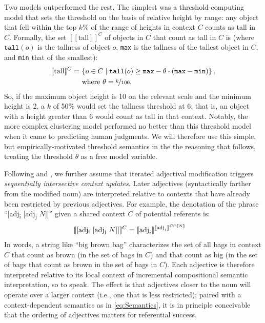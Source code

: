 \documentclass[10pt,a4paper]{article}
\newcommand{\den}[1]{\ensuremath{[\![#1]\!]}}
\begin{document}
Two models outperformed the rest. The simplest was a threshold-computing model that sets the threshold on the basis of relative height by range: any object that fell within the top $k\%$ of the range of heights in context $C$ counts as tall in $C$. Formally, the set $\den{\text{tall}}^C$ of objects in $C$ that count as tall in $C$ is (where $\texttt{tall}(o)$ is the tallness of object $o$, \texttt{max} is the tallness of the tallest object in $C$, and \texttt{min} that of the smallest):
\begin{align}
  \label{eq:Semantics}
  \den{\text{tall}}^C  = & \ \{ o \in C \mid \texttt{tall}(o) \ge \texttt{max} - \theta \cdot (\texttt{max} - \texttt{min}) \} \,, \\
  & \text{ where $\theta = \nicefrac{k}{100}$.} \nonumber
\end{align}
So, if the maximum object height is 10 on the relevant scale and the minimum height is 2, a $k$ of 50\% would set the tallness threshold at 6; that is, an object with a height greater than 6 would count as tall in that context. Notably, the more complex clustering model performed no better than this threshold model when it came to predicting human judgments. We will therefore use this simple, but empirically-motivated threshold semantics in the the reasoning that follows, treating the threshold $\theta$ as a free model variable.

Following  and , we further assume that iterated adjectival modification triggers \emph{sequentially intersective context updates}. Later adjectives (syntactically farther from the modified noun) are interpreted relative to contexts that have already been restricted by previous adjectives. For example, the denotation of the phrase ``[adj\textsubscript{i} [adj\textsubscript{j} $N$]]'' given a shared context $C$ of potential referents is:
\begin{align}
  \label{eq:SequentialInterpretation}
  \den{\text{[adj\textsubscript{i} [adj\textsubscript{j} $N$]]}}^{C} & = \den{\text{adj}_i}^{\den{\text{adj}_j}^{C\cap \den{N}}} 
\end{align} 
In words, a string like ``big brown bag'' characterizes the set of all bags in context $C$ that count as brown (in the set of bags in $C$) and that count as big (in the set of bags that count as brown in the set of bags in $C$). Each adjective is therefore interpreted relative to its local context of incremental compositional semantic interpretation, so to speak. The effect is that adjectives closer to the noun will operate over a larger context (i.e., one that is less restricted); paired with a context-dependent semantics as in \eqref{eq:Semantics}, it is in principle conceivable that the ordering of adjectives matters for referential success.
\end{document}
